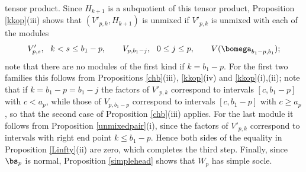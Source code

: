 \documentclass[11pt,reqno]{amsart}
\theoremstyle{definition} \newtheorem*{defn}{Definition}
\theoremstyle{definition}
\newenvironment{pf}{\proof}{\endproof}
\numberwithin{equation}{section}
\begin{document}
\begin{pf}
tensor product. Since $H_{k+1}$ is a subquotient of this tensor product, Proposition \ref{kkop}(iii)
shows that $(V'_{p,k},H_{k+1})$ is unmixed if $V'_{p,k}$ is unmixed with each of the modules
$$V_{p,s}',\ \ k<s\leq b_1-p, \qquad V_{p,b_1-j},\ \ 0\leq j\leq p, \qquad V(\bomega_{b_1-p,b_1});$$
note that there are no modules of the first kind if $k=b_1-p$. For the first two families this
follows from Propositions \ref{chb}(iii), \ref{kkop}(iv) and \ref{kkop}(i),(ii); note that if
$k=b_1-p=b_1-j$ the factors of $V'_{p,k}$ correspond to intervals $[c,b_1-p]$ with $c<a_p$, while those
of $V_{p,b_1-p}$ correspond to intervals $[c,b_1-p]$ with $c\ge a_p$, so that the second case of
Proposition \ref{chb}(iii) applies. For the last module it follows from Proposition
\ref{unmixedpair}(i), since the factors of $V'_{p,k}$ correspond to intervals with right end point
$k\le b_1-p$. Hence both sides of the equality in Proposition \ref{Linfty}(ii) are zero, which
completes the third step. Finally, since $\bs_p$ is normal, Proposition \ref{simplehead} shows that
$W_p$ has simple socle.
\end{pf}
\end{document}

